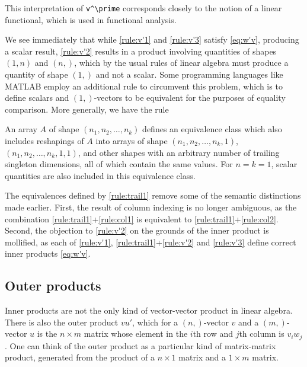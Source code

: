 This interpretation of \lstinline|v^\prime| corresponds closely to the notion of a
linear functional, which is used in functional analysis.

We see immediately that while \ref{rule:v'1} and \ref{rule:v'3} satisfy
\eqref{eq:w'v}, producing a scalar result, \ref{rule:v'2} results in a product
involving quantities of shapes $(1,n)$ and $(n,)$, which by the usual rules of
linear algebra must produce a quantity of shape $(1,)$ and not a scalar. Some
programming languages like MATLAB employ an additional rule to circumvent this
problem, which is to define scalars and $(1,)$-vectors to be equivalent for the
purposes of equality comparison. More generally, we have the rule

An array $A$ of shape $(n_1, n_2, \dots, n_k)$ defines an equivalence
class which also includes reshapings of $A$ into arrays of shape $(n_1, n_2,
\dots, n_k, 1)$, $(n_1, n_2, \dots, n_k, 1, 1)$, and other shapes with an
arbitrary number of trailing singleton dimensions, all of which contain the
same values. For $n = k = 1$, scalar quantities are also included in this
equivalence class.\label{rule:trail1}

The equivalences defined by \ref{rule:trail1} remove some of the semantic
distinctions made earlier. First, the result of column indexing is no longer
ambiguous, as the combination \ref{rule:trail1}+\ref{rule:col1} is equivalent
to \ref{rule:trail1}+\ref{rule:col2}. Second, the objection to \ref{rule:v'2}
on the grounds of the inner product is mollified, as each of
\ref{rule:v'1}, \ref{rule:trail1}+\ref{rule:v'2} and \ref{rule:v'3} define
correct inner products \eqref{eq:w'v}.



\subsection{Outer products}

Inner products are not the only kind of vector-vector product in linear
algebra. There is also the outer product $vu'$, which for a $(n,)$-vector $v$
and a $(m,)$-vector $u$ is the $n \times m$ matrix whose element in the $i$th
row and $j$th column is $v_i w_j$. One can think of the outer product as a
particular kind of matrix-matrix product, generated from the product of a $n
\times 1$ matrix and a $1 \times m$ matrix.

